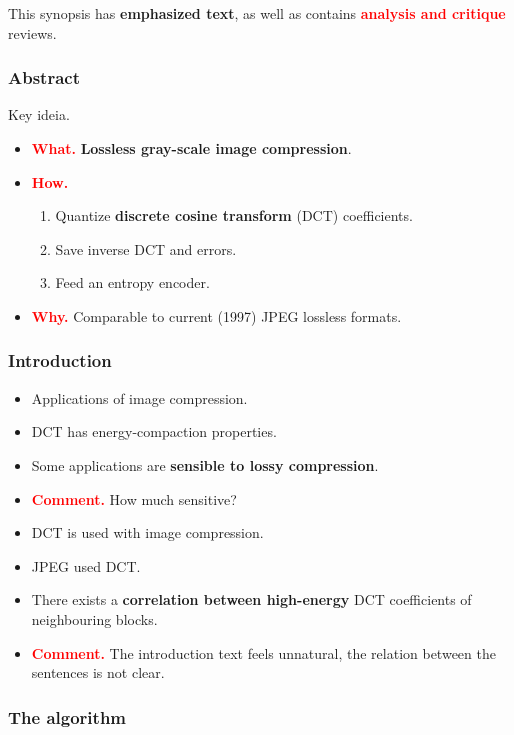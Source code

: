 \documentclass[10pt, twoside, twocolumn]{paper} %
\begin{document}
This synopsis has \textbf{emphasized text}, as well as contains \textcolor{red}{\textbf{analysis and critique}} reviews.

\subsubsection*{Abstract}

Key ideia.

\begin{itemize}[noitemsep]
  \item\textcolor{red}{\textbf{What.}} \textbf{Lossless gray-scale image compression}.
  \item\textcolor{red}{\textbf{How.}}
  \begin{enumerate}[label=\bfseries\arabic*.,noitemsep]
    \item Quantize \textbf{discrete cosine transform} (DCT) coefficients.
    \item Save inverse DCT and errors.
    \item Feed an entropy encoder.
  \end{enumerate}
  \item\textcolor{red}{\textbf{Why.}} Comparable to current (1997) JPEG lossless formats.
\end{itemize}

\subsubsection*{Introduction}

\begin{itemize}[noitemsep]
  \item Applications of image compression.
  \item DCT has energy-compaction properties.
  \item Some applications are \textbf{sensible to lossy compression}.
  \item\textcolor{red}{\textbf{Comment.}} How much sensitive?
  \item DCT is used with image compression.
  \item JPEG used DCT.
  \item There exists a \textbf{correlation between high-energy} DCT coefficients of neighbouring blocks.
  \item\textcolor{red}{\textbf{Comment.}} The introduction text feels unnatural, the relation between the sentences is not clear.
\end{itemize}

\subsubsection*{The algorithm}
\end{document}
